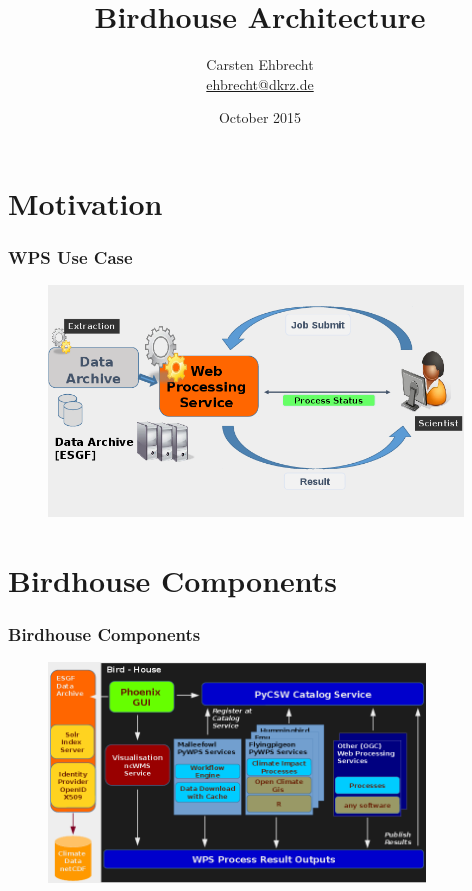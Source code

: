 \documentclass{beamer}
\title{Birdhouse Architecture}
\author{
Carsten Ehbrecht\\
\medskip
{\scriptsize \url{ehbrecht@dkrz.de}}
}
\institute{German Climate Computing Center (DKRZ)}
\date{October 2015}
\begin{document}
  \begin{frame}[plain]
    \titlepage
  \end{frame}


  \section{Motivation}

  \begin{frame}[plain]
    \frametitle{WPS Use Case}
    \begin{figure}
      \includegraphics[width=11cm]{images/wps-use-case.png}
    \end{figure}
  \end{frame}

  \section{Birdhouse Components}

  \begin{frame}
    \frametitle{Birdhouse Components}
     \begin{figure}
      \includegraphics[width=10cm]{images/birdhouse.png}
    \end{figure}
  \end{frame}
\end{document}
